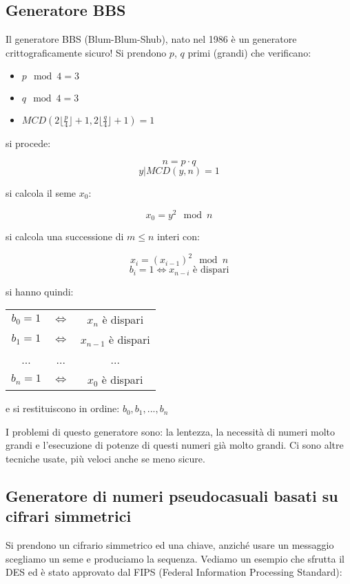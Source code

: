 \subsection{Generatore BBS}
Il generatore BBS (Blum-Blum-Shub), nato nel 1986 è un generatore crittograficamente sicuro! Si prendono $p$, $q$ primi (grandi) che verificano:

\begin{itemize}
    \item $ p \mod 4 = 3 $
    \item $ q \mod 4 = 3 $
    \item $ MCD(2 \lfloor \frac{p}{4} \rfloor + 1, 2 \lfloor \frac{q}{4} \rfloor + 1) = 1 $
\end{itemize}

si procede:

$$ n = p \cdot q $$
$$ y | MCD(y, n) = 1 $$

si calcola il seme $x_{0}$:

$$ x_{0} = y^{2} \mod n $$

si calcola una successione di $ m \leq n $ interi con:

$$ x_{i} = (x_{i-1})^{2} \mod n $$
$$ b_{i} = 1 \Longleftrightarrow x_{n-i} \text{ è dispari} $$

si hanno quindi:

\begin{table}[!ht]
    \centering
    \begin{tabular}{c c c}
        $b_{0} = 1$ & $ \Longleftrightarrow $ & $ x_{n} $ è dispari\\
        $b_{1} = 1$ & $ \Longleftrightarrow $ & $ x_{n-1} $ è dispari\\
        ... & ... & ... \\
        $b_{n} = 1$ & $ \Longleftrightarrow $ & $ x_{0} $ è dispari\\
    \end{tabular}
\end{table}

e si restituiscono in ordine: $b_{0}, b_{1}, ..., b_{n}$

I problemi di questo generatore sono: la lentezza, la necessità di numeri molto grandi e l'esecuzione di potenze di questi numeri già molto grandi. Ci sono altre tecniche usate, più veloci anche se meno sicure.

\subsection{Generatore di numeri pseudocasuali basati su cifrari simmetrici}
Si prendono un cifrario simmetrico ed una chiave, anziché usare un messaggio scegliamo un seme e produciamo la sequenza. Vediamo un esempio che sfrutta il DES ed è stato approvato dal FIPS (Federal Information Processing Standard):


